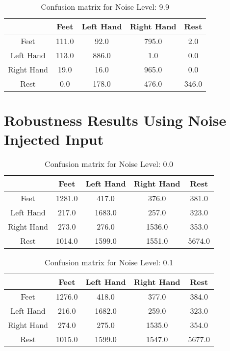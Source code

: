 \begin{table}[!htbp]
    \centering
    \begin{tabular}{|c||c|c|c|c|}
        \hline
		 & Feet & Left Hand & Right Hand & Rest \\
        \hline
        \hline
        Feet & 111.0 & 92.0 & 795.0 & 2.0 \\
        \hline
        Left Hand & 113.0 & 886.0 & 1.0 & 0.0 \\
        \hline
        Right Hand & 19.0 & 16.0 & 965.0 & 0.0 \\
        \hline
        Rest & 0.0 & 178.0 & 476.0 & 346.0 \\
        \hline
    \end{tabular}
    \caption{Confusion matrix for Noise Level: 9.9}
\end{table}

\section{Robustness Results Using Noise Injected Input}\label{sec:robustness-results-using-noise-injected-data}
\begin{table}[!htbp]
    \centering
    \begin{tabular}{|c||c|c|c|c|}
        \hline
		 & Feet & Left Hand & Right Hand & Rest \\
        \hline
        \hline
        Feet & 1281.0 & 417.0 & 376.0 & 381.0 \\
        \hline
        Left Hand & 217.0 & 1683.0 & 257.0 & 323.0 \\
        \hline
        Right Hand & 273.0 & 276.0 & 1536.0 & 353.0 \\
        \hline
        Rest & 1014.0 & 1599.0 & 1551.0 & 5674.0 \\
        \hline
    \end{tabular}
    \caption{Confusion matrix for Noise Level: 0.0}
\end{table}

\begin{table}[!htbp]
    \centering
    \begin{tabular}{|c||c|c|c|c|}
        \hline
		 & Feet & Left Hand & Right Hand & Rest \\
        \hline
        \hline
        Feet & 1276.0 & 418.0 & 377.0 & 384.0 \\
        \hline
        Left Hand & 216.0 & 1682.0 & 259.0 & 323.0 \\
        \hline
        Right Hand & 274.0 & 275.0 & 1535.0 & 354.0 \\
        \hline
        Rest & 1015.0 & 1599.0 & 1547.0 & 5677.0 \\
        \hline
    \end{tabular}
    \caption{Confusion matrix for Noise Level: 0.1}
\end{table}

